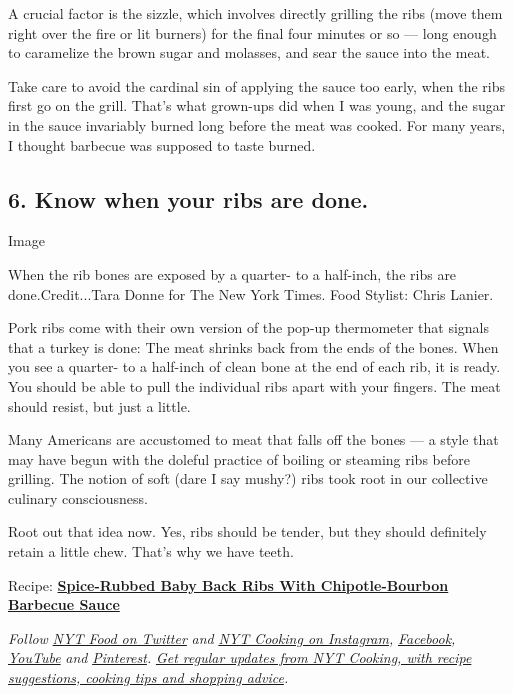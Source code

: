 A crucial factor is the sizzle, which involves directly grilling the
ribs (move them right over the fire or lit burners) for the final four
minutes or so --- long enough to caramelize the brown sugar and
molasses, and sear the sauce into the meat.

Take care to avoid the cardinal sin of applying the sauce too early,
when the ribs first go on the grill. That's what grown-ups did when I
was young, and the sugar in the sauce invariably burned long before the
meat was cooked. For many years, I thought barbecue was supposed to
taste burned.

\hypertarget{6-know-when-your-ribs-are-done}{%
\subsection{6. Know when your ribs are
done.}\label{6-know-when-your-ribs-are-done}}

Image

When the rib bones are exposed by a quarter- to a half-inch, the ribs
are done.Credit...Tara Donne for The New York Times. Food Stylist: Chris
Lanier.

Pork ribs come with their own version of the pop-up thermometer that
signals that a turkey is done: The meat shrinks back from the ends of
the bones. When you see a quarter- to a half-inch of clean bone at the
end of each rib, it is ready. You should be able to pull the individual
ribs apart with your fingers. The meat should resist, but just a little.

Many Americans are accustomed to meat that falls off the bones --- a
style that may have begun with the doleful practice of boiling or
steaming ribs before grilling. The notion of soft (dare I say mushy?)
ribs took root in our collective culinary consciousness.

Root out that idea now. Yes, ribs should be tender, but they should
definitely retain a little chew. That's why we have teeth.

Recipe:
\textbf{\href{https://cooking.nytimes3xbfgragh.onion/recipes/1021242-spice-rubbed-baby-back-ribs-with-chipotle-bourbon-barbecue-sauce}{Spice-Rubbed
Baby Back Ribs With Chipotle-Bourbon Barbecue Sauce}}

\emph{Follow} \href{https://twitter.com/nytfood}{\emph{NYT Food on
Twitter}} \emph{and}
\href{https://www.instagram.com/nytcooking/}{\emph{NYT Cooking on
Instagram}}\emph{,}
\href{https://www.facebookcorewwwi.onion/nytcooking/}{\emph{Facebook}}\emph{,}
\href{https://www.youtube.com/nytcooking}{\emph{YouTube}} \emph{and}
\href{https://www.pinterest.com/nytcooking/}{\emph{Pinterest}}\emph{.}
\href{https://www.nytimes3xbfgragh.onion/newsletters/cooking}{\emph{Get
regular updates from NYT Cooking, with recipe suggestions, cooking tips
and shopping advice}}\emph{.}

